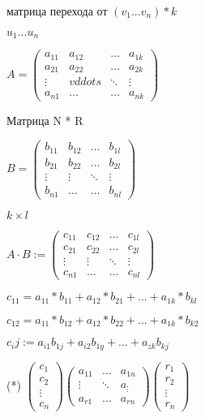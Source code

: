 матрица перехода от $(v_1 ... v_n) * k $

$u_1 ... u_n$

\begin{definition}
    $A = \left(
    \begin{array}{cccc}
        a_{11} & a_{12} & \ldots & a_{1k}\\
        a_{21} & a_{22} & \ldots & a_{2k}\\
        \vdots & vddots & \ddots & \vdots\\
        a_{n1} &\ldots & \ldots & a_{nk}
    \end{array}
    \right)$

    Матрица N * R

    $B = \left(
    \begin{array}{cccc}
        b_{11} & b_{12} & \ldots & b_{1l}\\
        b_{21} & b_{22} & \ldots & b_{2l}\\
        \vdots & \vdots & \ddots & \vdots\\
        b_{n1} &\ldots & \ldots & b_{nl}
    \end{array}
    \right)$

    $k \times l$

    $A \cdot B := \left(
        \begin{array}{cccc}
            c_{11} & c_{12} & \ldots & c_{1l}\\
            c_{21} & c_{22} & \ldots & c_{2l}\\
            \vdots & \vdots & \ddots & \vdots\\
            c_{n1} &\ldots & \ldots & c_{nl}
        \end{array}
        \right)$

    $c_{11} = a_{11} * b_{11} + a_{12} * b_{21} + ... + a_{1k} * b_{kl}$

    $c_{12} = a_{11} * b_{12} + a_{12} * b_{22} + ... + a_{1k} * b_{k2}$


\end{definition}

$c_ij := a_{i1} b_{1j} + a_{i2} b_{1y} + ... + a_{zk} b_{kj}$


(*) $\left(
    \begin{array}{c}
        c_{1} \\
        c_{2} \\
        \vdots \\
        c_{n} 
    \end{array}
    \right) \left(
        \begin{array}{ccc}
            a_{11} & \ldots & a_{1n}\\
            \vdots & \ddots & a_{\vdots}\\
            a_{r1} &\ldots & a_{rn}
        \end{array}
        \right) \left(
            \begin{array}{c}
                r_{1}\\
                r_{2}\\
                \vdots\\
                r_{n}
            \end{array}
            \right)$

